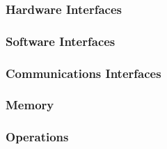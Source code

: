 \documentclass[english]{article}
\begin{document}
				\subsubsection{Hardware Interfaces}
				   
				\subsubsection{Software Interfaces}
			
				\subsubsection{Communications Interfaces}
			
				\subsubsection{Memory}

				\subsubsection{Operations}
\end{document}
